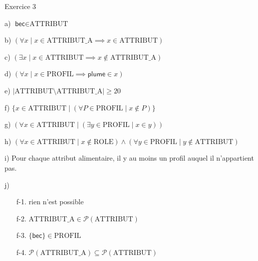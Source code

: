 \documentclass{article}
\begin{document}
\newcommand{\role}{\mbox{ROLE}}
\newcommand{\attribut}{\mbox{ATTRIBUT}}
\newcommand{\attributn}{\mbox{ATTRIBUT\_A}}
\newcommand{\profil}{\mbox{PROFIL}}

Exercice 3

\vspace{0.5cm}

a) $ \textsf{bec} \in \attribut $

\vspace{0.5cm}

b) $ (\forall x \mid x \in \attributn \implies x \in \attribut) $

\vspace{0.5cm}

c) $ (\exists x  \mid x \in \attribut \implies x \notin \attributn) $

\vspace{0.5cm}

d) $ (\forall x \mid x \in \profil \implies \textsf{plume} \in x) $

\vspace{0.5cm}

e) $ |\attribut \setminus \attributn | \geq 20 $

\vspace{0.5cm}

f) $\{ x \in \attribut \mid (\forall P \in \profil \mid x \notin P) \}  $

\vspace{0.5cm}

g) $(\forall x \in \attribut \mid (\exists y \in \profil \mid x \in y))$

\vspace{0.5cm}

h) $ (\forall x \in \attribut \mid x \notin \role) \land (\forall y \in \profil \mid y \notin \attribut) $

\vspace{0.5cm}

i) Pour chaque attribut alimentaire, il y au moins un profil auquel il n'appartient pas.

\vspace{0.5cm}

j)
\begin{itemize}
\item[f-1.] rien n’est possible
\item[f-2.] $\attributn \in \mathcal{P}(\attribut)$
\item[f-3.] $\{\textsf{bec}\} \in \profil$
\item[f-4.] $\mathcal{P}(\attributn) \subseteq \mathcal{P}(\attribut)$
\end{itemize}
\end{document}
